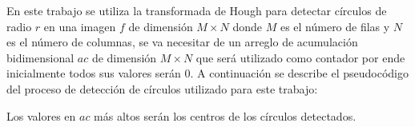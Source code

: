   En este trabajo se utiliza la transformada de Hough para detectar círculos de radio $r$ en una imagen $f$ de dimensión $M\times N$ donde $M$ es el número de filas y  $N$ es el número de columnas, se va necesitar de un arreglo de acumulación bidimensional $ac$  de dimensión $M \times N$ que será utilizado como contador por ende inicialmente todos sus valores serán $0$. A continuación se describe el pseudocódigo del proceso de detección de círculos utilizado para este trabajo:
  
  Los valores en  $ac$ más altos serán los centros de los círculos detectados.
  
 



  

   
   

